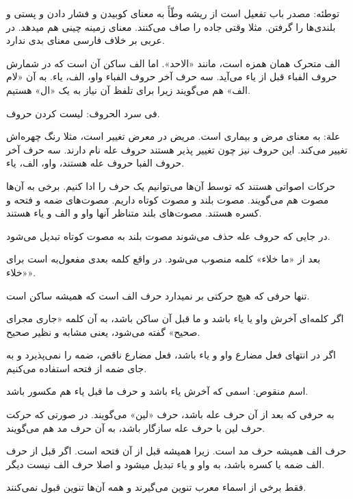 \documentclass{article}
\begin{document}
\begin{addpage}{2}
  \vspace*{0.3cm}
  \begin{note}
    توطئه: مصدر باب تفعیل است از ریشه وطّأَ
    به معنای کوبیدن و فشار دادن و پستی و بلندی‌ها را گرفتن. مثلا وقتی جاده را صاف می‌کنند. معنای زمینه چینی هم میدهد. در عربی بر خلاف فارسی معنای بدی ندارد.
  \end{note}
  \begin{note}
    الف متحرک همان همزه است، مانند «الاحد». اما الف ساکن آن است که در شمارش حروف الفباء قبل از یاء می‌آید. سه حرف آخر حروف الفباء
    واو، الف، یاء. به آن «لام الف» هم می‌گویند زیرا برای تلفظ آن نیاز به یک «ال» هستیم.
  \end{note}
  \begin{note}
    فی سرد الحروف: لیست کردن حروف.
  \end{note}
  \begin{note}
    علة: به معنای مرض و بیماری است. مریض در معرض تغییر است، مثلا رنگ چهره‌اش تغییر می‌کند. این حروف نیز چون تغییر پذیر هستند حروف عله نام دارند.
    سه حرف آخر حروف الفبا حروف عله هستند، واو، الف، یاء.
  \end{note}
  \begin{note}
    حرکات اصواتی هستند که توسط آن‌ها می‌توانیم یک حرف را ادا کنیم. برخی به آن‌ها مصوت هم می‌گویند. مصوت بلند و مصوت کوتاه داریم. مصوت‌های ضمه و فتحه و کسره هستند.
    مصوت‌های بلند متناظر آنها واو و الف و یاء هستند.

    در جایی که حروف عله حذف می‌شوند مصوت بلند به مصوت کوتاه تبدیل می‌شود.
  \end{note}
  \begin{note}
    بعد از «ما خلاء» کلمه منصوب می‌شود. در واقع کلمه بعدی مفعول‌به است برای «خلاء».
    
    تنها حرفی که هیچ حرکتی بر نمیدارد حرف الف است که همیشه ساکن است.
  \end{note}
  \begin{note}
    اگر کلمه‌ای آخرش واو یا یاء باشد و ما قبل آن ساکن باشد، به آن کلمه «جاری مجرای صحیح» گفته می‌شود، یعنی مشابه و نظیر صحیح.

    اگر در انتهای فعل مضارع واو و یاء باشد، فعل مضارع ناقص، ضمه را نمی‌پذیرد و به جای ضمه از فتحه استفاده می‌کنیم.

    اسم منقوص: اسمی که آخرش یاء باشد و حرف ما قبل یاء هم مکسور باشد.
  \end{note}
  \begin{note}
    به حرفی که بعد از آن حرف عله باشد، حرف «لین» می‌گویند. در صورتی که حرکت حرف لین با حرف عله سازگار باشد، به آن حرف مد هم می‌گویند.
  \end{note}
  \begin{note}
    حرف الف همیشه حرف مد است. زیرا همیشه قبل از آن فتحه است. اگر قبل از حرف الف ضمه یا کسره باشد، به واو و یاء تبدیل میشود و اصلا حرف الف نیست دیگر.
  \end{note}
  \vspace*{2cm}
  \begin{note}
    فقط برخی از اسماء معرب تنوین می‌گیرند و همه آن‌ها تنوین قبول نمی‌کنند.
  \end{note}
\end{addpage}
\end{document}
